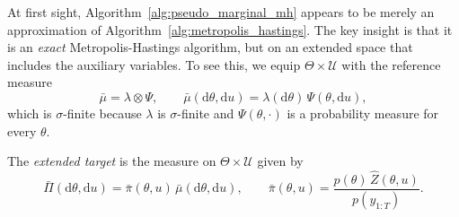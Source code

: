 At first sight, Algorithm~\ref{alg:pseudo_marginal_mh} appears to be merely an approximation of Algorithm~\ref{alg:metropolis_hastings}. The key insight is that it is an \emph{exact} Metropolis-Hastings algorithm, but on an extended space that includes the auxiliary variables. To see this, we equip $\Theta\times\mathcal{U}$ with the reference measure
\begin{equation}
    \bar{\mu} = \lambda\otimes\Psi, \qquad \bar{\mu}(\mathrm{d}\theta,\mathrm{d}u) = \lambda(\mathrm{d}\theta)\,\Psi(\theta,\mathrm{d}u),
\end{equation}
which is $\sigma$-finite because $\lambda$ is $\sigma$-finite and $\Psi(\theta,\cdot)$ is a probability measure for every $\theta$.

\begin{definition}
    \label{def:extended_target}
    The \emph{extended target} is the measure on $\Theta\times\mathcal{U}$ given by
    \begin{equation}
        \bar{\Pi}(\mathrm{d}\theta,\mathrm{d}u) = \bar{\pi}(\theta,u)\,\bar{\mu}(\mathrm{d}\theta,\mathrm{d}u), \qquad
        \bar{\pi}(\theta,u) = \frac{p(\theta)\,\hat{Z}(\theta,u)}{p(y_{1:T})}.
        \label{eq:extended_target}
    \end{equation}
\end{definition}

